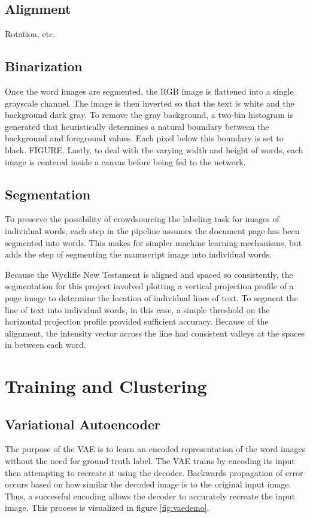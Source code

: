 \documentclass[final]{ukthesis}
\begin{document}
\subsection{Alignment}
Rotation, etc.

\subsection{Binarization}
Once the word images are segmented, the RGB image is flattened into a single grayscale channel. The image is then inverted so that the text is white and the background dark gray. To remove the gray background, a two-bin histogram is generated that heuristically determines a natural boundary between the background and foreground values. Each pixel below this boundary is set to black. FIGURE. Lastly, to deal with the varying width and height of words, each image is centered inside a canvas before being fed to the network.


\subsection{Segmentation}
To preserve the possibility of crowdsourcing the labeling task for images of individual words, each step in the pipeline assumes the document page has been segmented into words. This makes for simpler machine learning mechanisms, but adds the step of segmenting the manuscript image into individual words.

Because the Wycliffe New Testament is aligned and spaced so consistently, the segmentation for this project involved plotting a vertical projection profile of a page image to determine the location of individual lines of text. To segment the line of text into individual words, in this case, a simple threshold on the horizontal projection profile provided sufficient accuracy. Because of the alignment, the intensity vector across the line had consistent valleys at the spaces in between each word.



\section{Training and Clustering}

\subsection{Variational Autoencoder}
The purpose of the VAE is to learn an encoded representation of the word images without the need for ground truth label. The VAE trains by encoding its input then attempting to recreate it using the decoder. Backwards propagation of error occurs based on how similar the decoded image is to the original input image. Thus, a successful encoding allows the decoder to accurately recreate the input image. This process is visualized in figure \ref{fig:vaedemo}.
\end{document}
